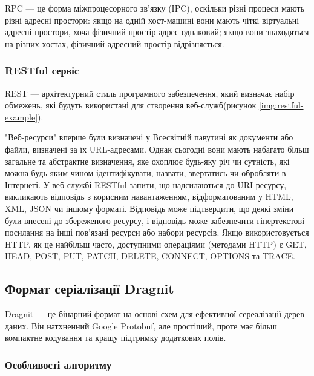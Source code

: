 \documentclass{lib/styles/default-style}
\begin{document}
    RPC --- це форма міжпроцесорного зв'язку (IPC), оскільки різні процеси
    мають різні адресні простори: якщо на одній хост-машині вони мають чіткі віртуальні
    адресні простори, хоча фізичний простір адрес однаковий; якщо вони знаходяться на різних хостах,
    фізичний адресний простір відрізняється.

    \subsubsection{RESTful сервіс}
    
    REST --- архітектурний стиль програмного забезпечення, який визначає набір обмежень,
    які будуть використані для створення веб-служб(рисунок \ref{img:restful-example}).
    

    "Веб-ресурси" вперше були визначені у Всесвітній павутині як документи або файли, визначені за їх URL-адресами.
    Однак сьогодні вони мають набагато більш загальне та абстрактне визначення, яке охоплює будь-яку річ чи сутність,
    які можна будь-яким чином ідентифікувати, назвати, звертатись чи обробляти в Інтернеті.
    У веб-службі RESTful запити, що надсилаються до URI ресурсу, викликають відповідь з корисним навантаженням,
    відформатованим у HTML, XML, JSON чи іншому форматі. Відповідь може підтвердити, що деякі зміни були внесені
    до збереженого ресурсу, і відповідь може забезпечити гіпертекстові посилання на інші пов'язані ресурси або набори ресурсів.
    Якщо використовується HTTP, як це найбільш часто, доступними операціями (методами HTTP) є GET, HEAD, POST, PUT,
    PATCH, DELETE, CONNECT, OPTIONS та TRACE.



    \subsection{Формат серіалізації Dragnit}

    Dragnit --- це бінарний формат на основі схем для ефективної сереалізації дерев даних. Він натхненний
    Google Protobuf, але простіший, проте має більш компактне кодування та кращу підтримку додаткових полів.
    
    \subsubsection{Особливості алгоритму}
\end{document}
